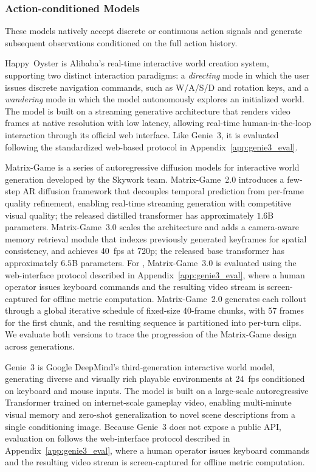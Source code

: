 \subsubsection{Action-conditioned Models}

These models natively accept discrete or continuous action signals and generate subsequent observations conditioned on the full action history.

Happy~Oyster is Alibaba's real-time interactive world creation system, supporting two distinct interaction paradigms: a \emph{directing} mode in which the user issues discrete navigation commands, such as W/A/S/D and rotation keys, and a \emph{wandering} mode in which the model autonomously explores an initialized world.
The model is built on a streaming generative architecture that renders video frames at native resolution with low latency, allowing real-time human-in-the-loop interaction through its official web interface.
Like Genie~3, it is evaluated following the standardized web-based protocol in Appendix~\ref{app:genie3_eval}.

Matrix-Game is a series of autoregressive diffusion models for interactive world generation developed by the Skywork team.
Matrix-Game~2.0 introduces a few-step AR diffusion framework that decouples temporal prediction from per-frame quality refinement, enabling real-time streaming generation with competitive visual quality; the released distilled transformer has approximately $1.6$B parameters.
Matrix-Game~3.0 scales the architecture and adds a camera-aware memory retrieval module that indexes previously generated keyframes for spatial consistency, and achieves 40~fps at 720p; the released base transformer has approximately $6.5$B parameters.
For \benchmark, Matrix-Game~3.0 is evaluated using the web-interface protocol described in Appendix~\ref{app:genie3_eval}, where a human operator issues keyboard commands and the resulting video stream is screen-captured for offline metric computation.
Matrix-Game~2.0 generates each rollout through a global iterative schedule of fixed-size $40$-frame chunks, with $57$ frames for the first chunk, and the resulting sequence is partitioned into per-turn clips.
We evaluate both versions to trace the progression of the Matrix-Game design across generations.

Genie~3 is Google DeepMind's third-generation interactive world model, generating diverse and visually rich playable environments at 24~fps conditioned on keyboard and mouse inputs.
The model is built on a large-scale autoregressive Transformer trained on internet-scale gameplay video, enabling multi-minute visual memory and zero-shot generalization to novel scene descriptions from a single conditioning image.
Because Genie~3 does not expose a public API, evaluation on \benchmark follows the web-interface protocol described in Appendix~\ref{app:genie3_eval}, where a human operator issues keyboard commands and the resulting video stream is screen-captured for offline metric computation.

